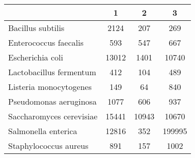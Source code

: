 \begin{adjustbox}{center}
\begin{tabular}{|l||c|c|c|}
\hline
& 1 & 2 & 3 \\
\hline
\hline
Bacillus subtilis & \cellcolor[RGB]{235, 71, 71} 2124 & \cellcolor[RGB]{227, 227, 252} 207 & \cellcolor[RGB]{241, 241, 253} 269 \\
\hline
Enterococcus faecalis & \cellcolor[RGB]{241, 241, 253} 593 & \cellcolor[RGB]{227, 227, 252} 547 & \cellcolor[RGB]{253, 241, 241} 667 \\
\hline
Escherichia coli & \cellcolor[RGB]{253, 237, 237} 13012 & \cellcolor[RGB]{218, 218, 251} 1401 & \cellcolor[RGB]{255, 255, 255} 10740 \\
\hline
Lactobacillus fermentum & \cellcolor[RGB]{250, 250, 254} 412 & \cellcolor[RGB]{223, 223, 251} 104 & \cellcolor[RGB]{254, 250, 250} 489 \\
\hline
Listeria monocytogenes & \cellcolor[RGB]{237, 237, 253} 149 & \cellcolor[RGB]{232, 232, 252} 64 & \cellcolor[RGB]{252, 232, 232} 840 \\
\hline
Pseudomonas aeruginosa & \cellcolor[RGB]{252, 227, 227} 1077 & \cellcolor[RGB]{218, 218, 251} 606 & \cellcolor[RGB]{255, 255, 255} 937 \\
\hline
Saccharomyces cerevisiae & \cellcolor[RGB]{235, 71, 71} 15441 & \cellcolor[RGB]{253, 237, 237} 10943 & \cellcolor[RGB]{237, 237, 253} 10670 \\
\hline
Salmonella enterica & \cellcolor[RGB]{232, 232, 252} 12816 & \cellcolor[RGB]{232, 232, 252} 352 & \cellcolor[RGB]{252, 232, 232} 199995 \\
\hline
Staphylococcus aureus & \cellcolor[RGB]{250, 250, 254} 891 & \cellcolor[RGB]{218, 218, 251} 157 & \cellcolor[RGB]{254, 250, 250} 1002 \\
\hline
\end{tabular}
\end{adjustbox}

